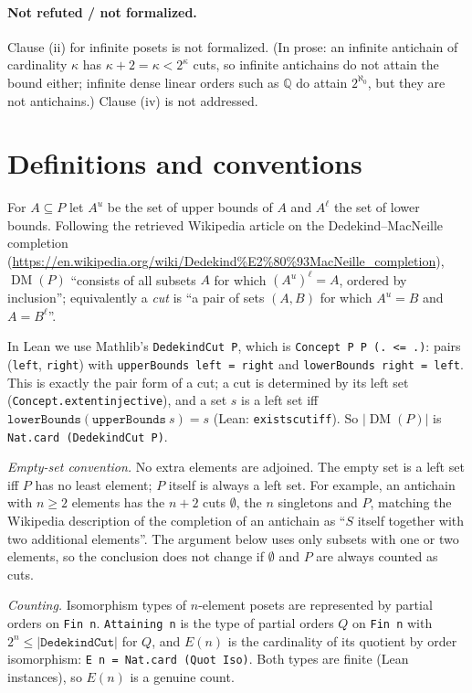 \documentclass[11pt]{article}
\theoremstyle{definition}
\theoremstyle{remark}
\renewcommand{\_}{\oldus\allowbreak}
\newcommand{\DM}{\operatorname{DM}}
\begin{document}
\paragraph{Not refuted / not formalized.} Clause (ii) for infinite posets is not formalized. (In prose:
an infinite antichain of cardinality $\kappa$ has $\kappa + 2 = \kappa < 2^\kappa$ cuts, so infinite
antichains do not attain the bound either; infinite dense linear orders such as $\mathbb{Q}$ do attain
$2^{\aleph_0}$, but they are not antichains.) Clause (iv) is not addressed.

\section{Definitions and conventions}

For $A \subseteq P$ let $A^u$ be the set of upper bounds of $A$ and $A^\ell$ the set of lower bounds.
Following the retrieved Wikipedia article on the Dedekind--MacNeille completion
(\url{https://en.wikipedia.org/wiki/Dedekind%E2%80%93MacNeille_completion}), $\DM(P)$ ``consists of all
subsets $A$ for which $(A^u)^\ell = A$, ordered by inclusion''; equivalently a \emph{cut} is ``a pair of
sets $(A, B)$ for which $A^u = B$ and $A = B^\ell$''.

In Lean we use Mathlib's \texttt{DedekindCut P}, which is \texttt{Concept P P (. <= .)}: pairs
(\texttt{left}, \texttt{right}) with \texttt{upperBounds left = right} and \texttt{lowerBounds right =
left}. This is exactly the pair form of a cut; a cut is determined by its left set
(\texttt{Concept.extent\_injective}), and a set $s$ is a left set iff
$\texttt{lowerBounds}(\texttt{upperBounds}\ s) = s$ (Lean: \texttt{exists\_cut\_iff}). So
$|\DM(P)|$ is \texttt{Nat.card (DedekindCut P)}.

\emph{Empty-set convention.} No extra elements are adjoined. The empty set is a left set iff $P$ has no
least element; $P$ itself is always a left set. For example, an antichain with $n \ge 2$ elements has the
$n+2$ cuts $\emptyset$, the $n$ singletons and $P$, matching the Wikipedia description of the completion
of an antichain as ``$S$ itself together with two additional elements''. The argument below uses only
subsets with one or two elements, so the conclusion does not change if $\emptyset$ and $P$ are always
counted as cuts.

\emph{Counting.} Isomorphism types of $n$-element posets are represented by partial orders on
\texttt{Fin n}. \texttt{Attaining n} is the type of partial orders $Q$ on \texttt{Fin n} with $2^n \le
|\texttt{DedekindCut}|$ for $Q$, and $E(n)$ is the cardinality of its quotient by order isomorphism:
\texttt{E n = Nat.card (Quot Iso)}. Both types are finite (Lean instances), so $E(n)$ is a genuine count.
\end{document}
